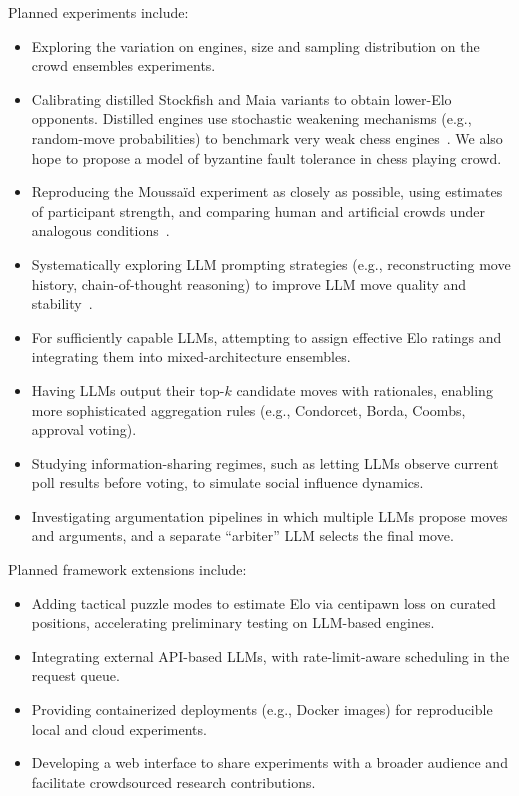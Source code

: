 \documentclass[sigconf]{aamas}
\begin{document}
Planned experiments include:
\begin{itemize}
  \item Exploring the variation on engines, size and sampling distribution on the crowd ensembles experiments.
  \item Calibrating distilled Stockfish and Maia variants to obtain lower-Elo opponents. Distilled engines use stochastic weakening mechanisms (e.g., random-move probabilities) to benchmark very weak chess engines~\cite{murphy2019}. We also hope to propose a model of byzantine fault tolerance in chess playing crowd.
  \item Reproducing the Moussaïd experiment as closely as possible, using estimates of participant strength, and comparing human and artificial crowds under analogous conditions~\cite{moussaid2025}.
  \item Systematically exploring LLM prompting strategies (e.g., reconstructing move history, chain-of-thought reasoning) to improve LLM move quality and stability~\cite{dynomight2024}.
  \item For sufficiently capable LLMs, attempting to assign effective Elo ratings and integrating them into mixed-architecture ensembles.
  \item Having LLMs output their top-\(k\) candidate moves with rationales, enabling more sophisticated aggregation rules (e.g., Condorcet, Borda, Coombs, approval voting).
  \item Studying information-sharing regimes, such as letting LLMs observe current poll results before voting, to simulate social influence dynamics.
  \item Investigating argumentation pipelines in which multiple LLMs propose moves and arguments, and a separate ``arbiter'' LLM selects the final move.
\end{itemize}

Planned framework extensions include:
\begin{itemize}
  \item Adding tactical puzzle modes to estimate Elo via centipawn loss on curated positions, accelerating preliminary testing on LLM-based engines.
  \item Integrating external API-based LLMs, with rate-limit-aware scheduling in the request queue.
  \item Providing containerized deployments (e.g., Docker images) for reproducible local and cloud experiments.
  \item Developing a web interface to share experiments with a broader audience and facilitate crowdsourced research contributions.
\end{itemize}
\end{document}
